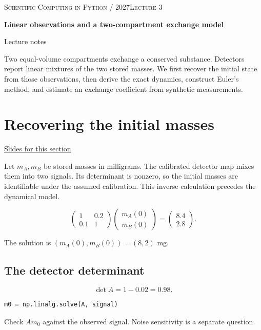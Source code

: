 \documentclass[11pt,letterpaper]{article}
\theoremstyle{definition}\newtheorem{definition}{Definition}\newtheorem{example}{Example}
\numberwithin{equation}{section}
\begin{document}
{\small\scshape Scientific Computing in Python / 2027\hfill Lecture 3}\par\medskip
{\raggedright{}\LARGE\bfseries\color{ink} Linear observations and a two-compartment exchange model\par}\medskip
{\small Lecture notes}\par\bigskip
Two equal-volume compartments exchange a conserved substance. Detectors report linear mixtures of the two stored masses. We first recover the initial state from those observations, then derive the exact dynamics, construct Euler's method, and estimate an exchange coefficient from synthetic measurements.

\section{Recovering the initial masses}
\hypertarget{note-recovering-the-initial-masses}{}\label{note:recovering-the-initial-masses}
{\small \href{slides.html\#frame=recovering-the-initial-masses\&step=1}{Slides for this section}}\par
Let $m_A,m_B$ be stored masses in milligrams. The calibrated detector map mixes them into two signals. Its determinant is nonzero, so the initial masses are identifiable under the assumed calibration. This inverse calculation precedes the dynamical model.

\[
\begin{pmatrix}1&0.2\\0.1&1\end{pmatrix}
\begin{pmatrix}m_A(0)\\m_B(0)\end{pmatrix}
=\begin{pmatrix}8.4\\2.8\end{pmatrix}.
\]

The solution is $(m_A(0),m_B(0))=(8,2)$ mg.

\subsection*{The detector determinant}
\[
\det A=1-0.02=0.98.
\]

\begin{minipage}{\linewidth}
\begin{verbatim}
m0 = np.linalg.solve(A, signal)
\end{verbatim}
\end{minipage}
Check $Am_0$ against the observed signal. Noise sensitivity is a separate question.
\end{document}
